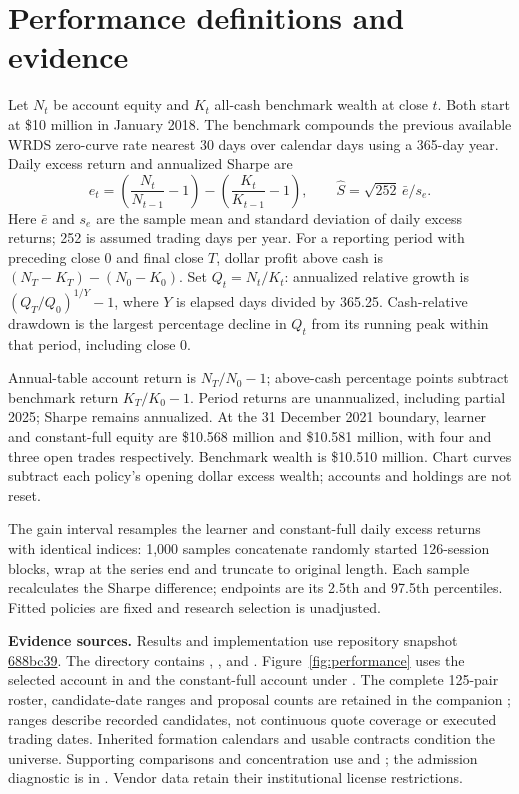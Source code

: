 \documentclass[11pt,letterpaper]{article}
\newcommand{\money}[1]{\$#1}
\begin{document}
\clearpage
\section{Performance definitions and evidence}
\label{app:metrics}
Let $N_t$ be account equity and $K_t$ all-cash benchmark wealth at close $t$.
Both start at \money{10 million} in January 2018. The benchmark compounds the
previous available WRDS zero-curve rate nearest 30 days over calendar days
using a 365-day year. Daily excess return and annualized Sharpe are
\[
e_t=\left(\frac{N_t}{N_{t-1}}-1\right)
-\left(\frac{K_t}{K_{t-1}}-1\right),\qquad
\widehat S=\sqrt{252}\,\bar e/s_e.
\]
Here $\bar e$ and $s_e$ are the sample mean and standard deviation of daily
excess returns; 252 is assumed trading days per year. For a reporting period
with preceding close $0$ and final close $T$, dollar profit above cash is
$(N_T-K_T)-(N_0-K_0)$. Set $Q_t=N_t/K_t$: annualized relative growth is
$(Q_T/Q_0)^{1/Y}-1$, where $Y$ is elapsed days divided by 365.25.
Cash-relative drawdown is the largest percentage decline in $Q_t$ from its
running peak within that period, including close $0$.

Annual-table account return is $N_T/N_0-1$; above-cash percentage points
subtract benchmark return $K_T/K_0-1$. Period returns are unannualized,
including partial 2025; Sharpe remains annualized. At the 31 December 2021
boundary, learner and constant-full equity are \money{10.568 million} and
\money{10.581 million}, with four and three open trades respectively.
Benchmark wealth is \money{10.510 million}. Chart curves subtract each policy's
opening dollar excess wealth; accounts and holdings are not reset.

The gain interval resamples the learner and constant-full daily excess returns
with identical indices: 1,000 samples concatenate randomly started 126-session
blocks, wrap at the series end and truncate to original length. Each sample
recalculates the Sharpe difference; endpoints are its 2.5th and 97.5th
percentiles. Fitted policies are fixed and research selection is unadjusted.

{\raggedright
\textbf{Evidence sources.} Results and implementation use repository snapshot
\href{https://github.com/kreitzz/rl-atm-vega-pairs/tree/688bc3909ba09be77af90df2d1c2696f316fedbe}{688bc39}.
The directory  contains
, ,  and
. Figure~\ref{fig:performance} uses the selected account in
 and the constant-full account
under .
The complete 125-pair roster, candidate-date ranges and proposal counts are
retained in the companion ; ranges describe
recorded candidates, not continuous quote coverage or executed trading dates.
Inherited formation calendars and usable contracts condition the universe.
Supporting comparisons and concentration use 
and ; the admission diagnostic is in
.
Vendor data retain their institutional license restrictions.\par}
\end{document}
